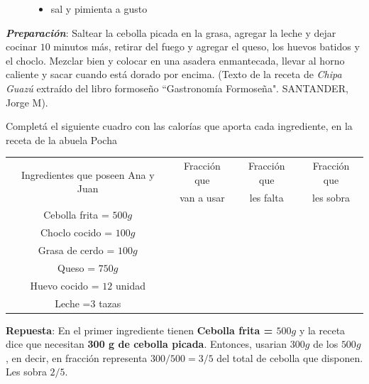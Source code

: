 \documentclass[11pt]{examdesign}
\theoremstyle{plain}
\theoremstyle{definition}
\theoremstyle{remark}
\begin{document}
\begin{shortanswer}[title={\textit{Receta que le dijo la Abuela Pocha a Ana y
    			Juan.}},
    	rearrange=no,resetcounter=no]
\begin{figure}[!h]
\begin{minipage}[b]{0.65\textwidth}
\begin{itemize}
    				\item sal y pimienta a gusto
    			\end{itemize}
    		\end{minipage}
    	\end{figure}
        \vspace{0.2cm}
        \textbf{\textit{\textcolor{upforestgreen}{Preparación}}}:
        \vspace{0.2cm}
        Saltear la cebolla picada en la grasa, agregar la leche y dejar cocinar $10$ minutos más, retirar del fuego y agregar el queso, los huevos batidos y el choclo. Mezclar bien y colocar en una asadera enmantecada, llevar al horno caliente y sacar cuando está dorado por encima. (\textcolor{dukeblue}{Texto de la receta de \textit{Chipa Guazú} extraído del libro formoseño “Gastronomía Formoseña". SANTANDER, Jorge M}).
    	\begin{question}
    		Completá el siguiente cuadro con las calorías que aporta cada ingrediente, en la receta de la abuela Pocha
    		\begin{center}
    			\begin{tabular}{|c|c|c|c|}
    				\hline 
    				\multirow{2}{*}{Ingredientes que poseen Ana y Juan} &Fracción que&
    				Fracción que&Fracción que
    				\\
    				                          &  van a usar   &les falta & les sobra
    				\\\hline  
    				Cebolla frita = $500g$    &               &          &    
    				\\\hline
    				Choclo cocido = $100g$    &               &          &    
    				\\\hline
    				Grasa de cerdo = $100g$   &               &          &    
    				\\\hline
    				Queso = $750g$            &               &          &    
    				\\\hline
    				Huevo cocido = $12$ unidad &              &          &    
    				\\\hline
    				Leche =$3$ tazas           &              &          &    
    				\\\hline
    			\end{tabular}
    		\end{center}
    		\begin{answer}
    			\textbf{Repuesta}: En el primer ingrediente tienen \textbf{Cebolla frita = $500g$} y la receta dice que necesitan \textbf{300 g de cebolla picada}. Entonces, usarian $300g$ de los $500g$, en decir, en fracción representa $300/500=3/5$ del total de cebolla que disponen. Les sobra $2/5$.

\end{answer}
\end{question}
\end{shortanswer}
\end{document}
